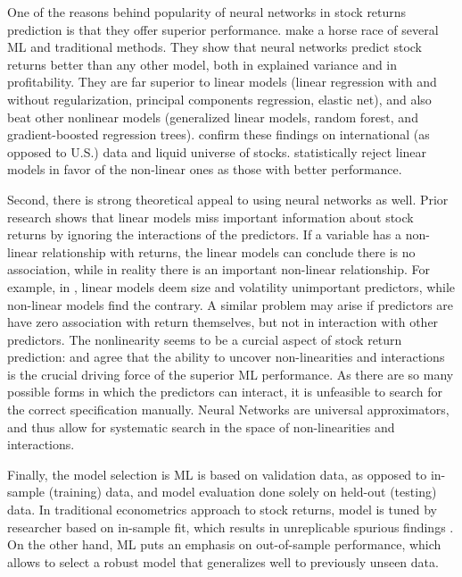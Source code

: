 			One of the reasons behind popularity of neural networks in stock returns prediction is that they offer superior performance. \cite{gu2020empirical} make a horse race of several ML and traditional methods. They show that neural networks predict stock returns better than any other model, both in explained variance and in profitability. They are far superior to linear models (linear regression with and without regularization, principal components regression, elastic net), and also beat other nonlinear models (generalized linear models, random forest, and gradient-boosted regression trees). \cite{tobek2020does} confirm these findings on international (as opposed to U.S.) data and liquid universe of stocks. \cite{gu2020empirical} statistically reject linear models in favor of the non-linear ones as those with better performance.
			
			Second, there is strong theoretical appeal to using neural networks as well. Prior research shows that linear models miss important information about stock returns by ignoring the interactions of the predictors. If a variable has a non-linear relationship with returns, the linear models can conclude there is no association, while in reality there is an important non-linear relationship. For example, in \cite{gu2020empirical}, linear models deem size and volatility unimportant predictors, while non-linear models find the contrary. A similar problem may arise if predictors are have zero association with return themselves, but not in interaction with other predictors. The nonlinearity seems to be a curcial aspect of stock return prediction: \cite{bryzgalova2019forest} and \cite{gu2020empirical} agree that the ability to uncover non-linearities and interactions is the crucial driving force of the superior ML performance.  As there are so many possible forms in which the predictors can interact, it is unfeasible to search for the correct specification manually. Neural Networks are universal approximators, and thus allow for systematic search in the space of non-linearities and interactions.  	
			
			Finally, the model selection is ML is based on validation data, as opposed to in-sample (training) data, and model evaluation done solely on held-out (testing) data. In traditional econometrics approach to stock returns, model is tuned by researcher based on in-sample fit, which results in unreplicable spurious findings \citep{mclean2016does}. On the other hand, ML puts an emphasis on out-of-sample performance, which allows to select a robust model that generalizes well to previously unseen data.  	
			
